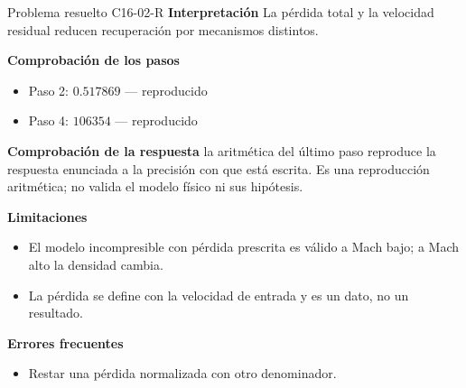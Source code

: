 \documentclass[10pt,openany]{book}
\begin{document}
\begin{studiumworked}{Problema resuelto C16-02-R}
\noindent\textbf{Interpretación}
La pérdida total y la velocidad residual reducen recuperación por mecanismos distintos.

\noindent\textbf{Comprobación de los pasos}
\begin{itemize}
\item Paso 2: $0.517869$ — reproducido
\item Paso 4: $106354$ — reproducido
\end{itemize}

\noindent\textbf{Comprobación de la respuesta} la aritmética del último paso reproduce la respuesta enunciada a la precisión con que está escrita. Es una reproducción aritmética; no valida el modelo físico ni sus hipótesis.

\noindent\textbf{Limitaciones}
\begin{itemize}
\item El modelo incompresible con pérdida prescrita es válido a Mach bajo; a Mach alto la densidad cambia.
\item La pérdida se define con la velocidad de entrada y es un dato, no un resultado.
\end{itemize}

\noindent\textbf{Errores frecuentes}
\begin{itemize}
\item Restar una pérdida normalizada con otro denominador.
\end{itemize}
\end{studiumworked}
\end{document}
